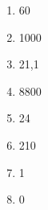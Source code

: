 %
%
    \begin{enumerate}
        \item 60
        \item \num{1000}
        \item 21,1
        \item \num{8800}
        \item 24
        \item 210
        \item 1
        \item 0
    \end{enumerate}
